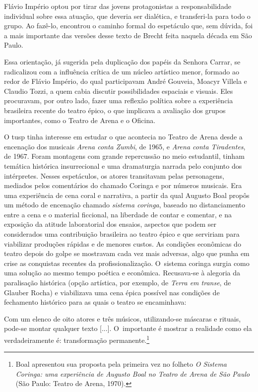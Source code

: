 {Flávio Império optou por tirar das jovens protagonistas a
responsabilidade individual sobre essa atuação, que deveria ser
dialética, e transferi-la para todo o grupo. Ao fazê-lo, encontrou o
caminho formal do espetáculo que, sem dúvida, foi a mais importante das
versões desse texto de Brecht feita naquela década em São Paulo.

Essa orientação, já sugerida pela duplicação dos papéis da Senhora
Carrar, se radicalizou com a influência crítica de um núcleo
artístico menor, formado ao redor de Flávio Império, do qual
participavam André Gouveia, Moacyr Villela e Claudio Tozzi, a quem cabia
discutir possibilidades espaciais e visuais. Eles procuravam, por outro
lado, fazer uma reflexão política sobre a experiência brasileira recente
do teatro épico, o que implicava a avaliação dos grupos importantes,
como o Teatro de Arena e o Oficina.

O {\sc tusp} tinha interesse em estudar o que acontecia no Teatro de Arena
desde a encenação dos musicais {\it Arena conta Zumbi}, de 1965, e
{\it Arena conta Tiradentes}, de 1967. Foram montagens com grande
repercussão no meio estudantil, tinham temática histórica insurrecional
e uma dramaturgia narrada pelo conjunto dos intérpretes. Nesses
espetáculos, os atores transitavam pelas personagens, mediados pelos
comentários do chamado Coringa e por números musicais. Era uma
experiência de cena coral e narrativa, a partir da qual Augusto Boal
propôs um método de encenação chamado {\it sistema coringa}, baseado no
distanciamento entre a cena e o material ficcional, na liberdade de
contar e comentar, e na exposição da atitude laboratorial dos ensaios,
aspectos que podem ser considerados uma contribuição brasileira ao
teatro épico e que serviriam para viabilizar produções rápidas e de
menores custos. As condições econômicas do teatro depois do golpe se
mostravam cada vez mais adversas, algo que punha em crise as conquistas
recentes da profissionalização. O~sistema coringa surgia como uma
solução ao mesmo tempo poética e econômica. Recusava-se à alegoria da
paralisação histórica (opção artística, por exemplo, de {\it Terra em
transe}, de Glauber Rocha) e viabilizava uma cena épica possível nas
condições de fechamento histórico para as quais o teatro se encaminhava:

\startblockquote
Com um elenco de oito atores e três músicos, utilizando-se máscaras e
rituais, pode-se montar qualquer texto {[}...{]}. O~importante é mostrar
a realidade como ela verdadeiramente é: transformação
permanente.\footnote{Boal apresentou sua proposta pela primeira vez no
  folheto {\it O Sistema Coringa: uma experiência de Augusto Boal no
  Teatro de Arena de São Paulo} (São Paulo: Teatro de Arena, 1970).}
\stopblockquote

}
